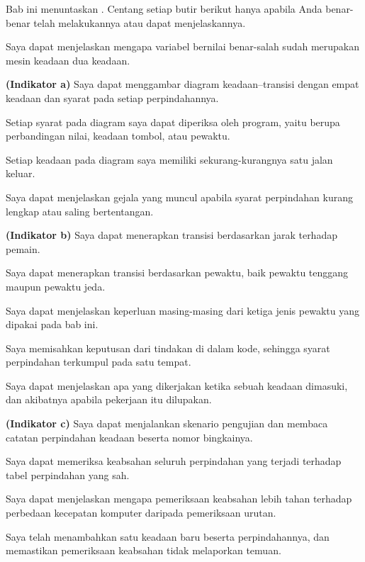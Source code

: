 
Bab ini menuntaskan . Centang setiap butir berikut hanya apabila
Anda benar-benar telah melakukannya atau dapat menjelaskannya.

\begin{checklistbox}
\begin{checklist}
  \item Saya dapat menjelaskan mengapa variabel bernilai benar-salah sudah
        merupakan mesin keadaan dua keadaan.
  \item {\bfseries (Indikator a)} Saya dapat menggambar diagram
        keadaan--transisi dengan empat keadaan dan syarat pada setiap
        perpindahannya.
  \item Setiap syarat pada diagram saya dapat diperiksa oleh program, yaitu
        berupa perbandingan nilai, keadaan tombol, atau pewaktu.
  \item Setiap keadaan pada diagram saya memiliki sekurang-kurangnya satu jalan
        keluar.
  \item Saya dapat menjelaskan gejala yang muncul apabila syarat perpindahan
        kurang lengkap atau saling bertentangan.
  \item {\bfseries (Indikator b)} Saya dapat menerapkan transisi berdasarkan
        jarak terhadap pemain.
  \item Saya dapat menerapkan transisi berdasarkan pewaktu, baik pewaktu
        tenggang maupun pewaktu jeda.
  \item Saya dapat menjelaskan keperluan masing-masing dari ketiga jenis
        pewaktu yang dipakai pada bab ini.
  \item Saya memisahkan keputusan dari tindakan di dalam kode, sehingga syarat
        perpindahan terkumpul pada satu tempat.
  \item Saya dapat menjelaskan apa yang dikerjakan ketika sebuah keadaan
        dimasuki, dan akibatnya apabila pekerjaan itu dilupakan.
  \item {\bfseries (Indikator c)} Saya dapat menjalankan skenario pengujian dan
        membaca catatan perpindahan keadaan beserta nomor bingkainya.
  \item Saya dapat memeriksa keabsahan seluruh perpindahan yang terjadi
        terhadap tabel perpindahan yang sah.
  \item Saya dapat menjelaskan mengapa pemeriksaan keabsahan lebih tahan
        terhadap perbedaan kecepatan komputer daripada pemeriksaan urutan.
  \item Saya telah menambahkan satu keadaan baru beserta perpindahannya, dan
        memastikan pemeriksaan keabsahan tidak melaporkan temuan.
\end{checklist}
\end{checklistbox}
